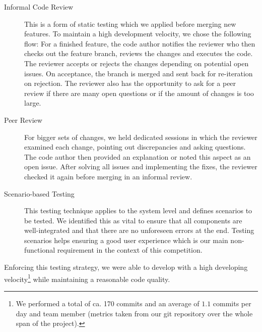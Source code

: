 \begin{description}
	\item[Informal Code Review] This is a form of static testing which we applied before merging new features. To maintain a high development velocity, we chose the following flow: For a finished feature, the code author notifies the reviewer who then checks out the feature branch, reviews the changes and executes the code. The reviewer accepts or rejects the changes depending on potential open issues. On acceptance, the branch is merged and sent back for re-iteration on rejection. The reviewer also has the opportunity to ask for a peer review if there are many open questions or if the amount of changes is too large.
	\item[Peer Review] For bigger sets of changes, we held dedicated sessions in which the reviewer examined each change, pointing out discrepancies and asking questions. The code author then provided an explanation or noted this aspect as an open issue. After solving all issues and implementing the fixes, the reviewer checked it again before merging in an informal review.
	\item[Scenario-based Testing] This testing technique applies to the system level and defines scenarios to be tested. We identified this as vital to ensure that all components are well-integrated and that there are no unforeseen errors at the end. Testing scenarios helps ensuring a good user experience which is our main non-functional requirement in the context of this competition. 
\end{description}
Enforcing this testing strategy, we were able to develop with a high developing velocity\footnote{We performed a total of ca. 170 commits and an average of $1.1$ commits per day and team member (metrics taken from our git repository over the whole span of the project).} while maintaining a reasonable code quality.
